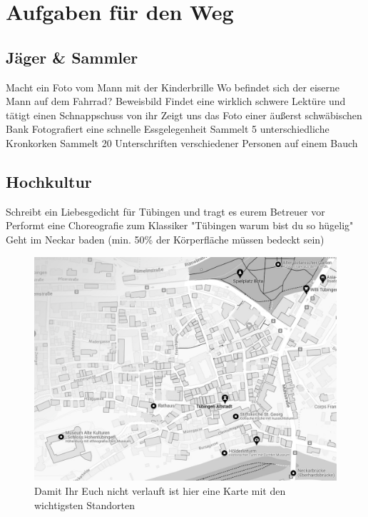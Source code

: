 \documentclass[11pt,paper=a4,answers]{exam}
\renewenvironment{questions}{
	\begin{q}
		\pointsinrightmargin
		\marginpointname{\ Pkt}
		\bracketedpoints }{
	\end{q}}
\begin{document}
\newpage

\section*{Aufgaben für den Weg}
\subsection*{Jäger \& Sammler}
\begin{questions}
	\question[5] Macht ein Foto vom Mann mit der Kinderbrille
	\question[5] Wo befindet sich der eiserne Mann auf dem Fahrrad? Beweisbild
	\question[5] Findet eine wirklich 	schwere Lektüre und tätigt einen Schnappschuss von ihr
	\question[5] Zeigt uns das Foto einer äußerst schwäbischen Bank
	\question[je 1] Fotografiert eine schnelle Essgelegenheit
	\question[10] Sammelt 5 unterschiedliche Kronkorken
	\question[20] Sammelt 20 Unterschriften verschiedener Personen auf einem Bauch
	
\end{questions}

\subsection*{Hochkultur}
\begin{questions}
	\question[10] Schreibt ein Liebesgedicht für Tübingen und tragt es eurem Betreuer vor
	\question[20] Performt eine Choreografie zum Klassiker "Tübingen warum bist du so hügelig"
	\question[Schnupfen + 50] Geht im Neckar baden (min. 50\% der Körperfläche müssen bedeckt sein)

\end{questions}
\vspace{15mm}
\begin{figure}[ht]
\includegraphics[width=\textwidth]{graphics/Karte_Stationen}
\captionsetup{labelformat=empty}
\caption{Damit Ihr Euch nicht verlauft ist hier eine Karte mit den wichtigsten Standorten}
\end{figure}
 
\end{document}
